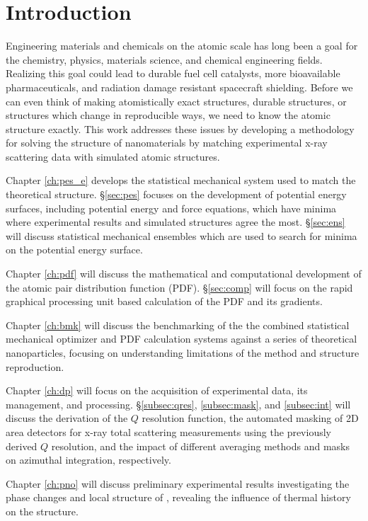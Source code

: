 \chapter{Introduction} \label{intro}
Engineering materials and chemicals on the atomic scale has long been a goal for the chemistry, physics, materials science, and chemical engineering fields.
Realizing this goal could lead to durable fuel cell catalysts, more bioavailable pharmaceuticals, and radiation damage resistant spacecraft shielding.
Before we can even think of making atomistically exact structures, durable structures, or structures which change in reproducible ways, we need to know the atomic structure exactly.
This work addresses these issues by developing a methodology for solving the structure of nanomaterials by matching experimental x-ray scattering data with simulated atomic structures.

Chapter \ref{ch:pes_e} develops the statistical mechanical system used to match the theoretical structure.
\S \ref{sec:pes} focuses on the development of potential energy surfaces, including potential energy and force equations, which have minima where experimental results and simulated structures agree the most.
\S \ref{sec:ens} will discuss statistical mechanical ensembles which are used to search for minima on the potential energy surface.

Chapter \ref{ch:pdf} will discuss the mathematical and computational development of the atomic pair distribution function (PDF).
\S \ref{sec:comp} will focus on the rapid graphical processing unit based calculation of the PDF and its gradients.

Chapter \ref{ch:bmk} will discuss the benchmarking of the the combined statistical mechanical optimizer and PDF calculation systems against a series of theoretical nanoparticles, focusing on understanding limitations of the method and structure reproduction.

Chapter \ref{ch:dp} will focus on the acquisition of experimental data, its management, and processing.
\S \ref{subsec:qres}, \ref{subsec:mask}, and \ref{subsec:int} will discuss the derivation of the $Q$ resolution function, the automated masking of 2D area detectors for x-ray total scattering measurements using the previously derived $Q$ resolution, and the impact of different averaging methods and masks on azimuthal integration, respectively.

Chapter \ref{ch:pno} will discuss preliminary experimental results investigating the phase changes and local structure of , revealing the influence of thermal history on the structure.